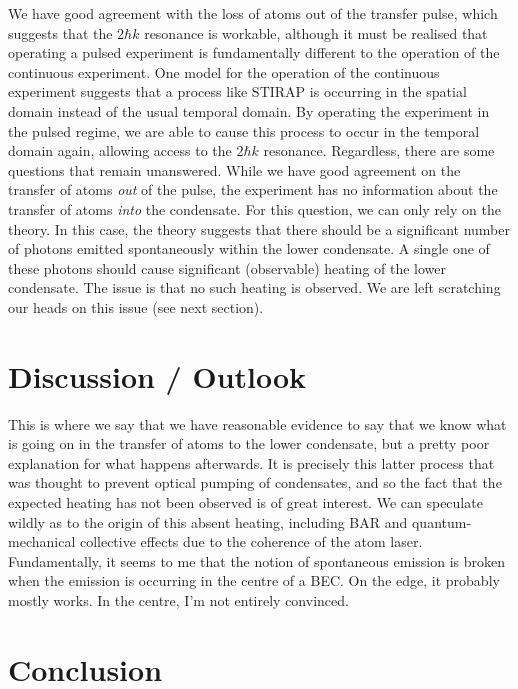 We have good agreement with the loss of atoms out of the transfer pulse, which suggests that the $2 \hbar k$ resonance is workable, although it must be realised that operating a pulsed experiment is fundamentally different to the operation of the continuous experiment.  One model for the operation of the continuous experiment suggests that a process like STIRAP is occurring in the spatial domain instead of the usual temporal domain.  By operating the experiment in the pulsed regime, we are able to cause this process to occur in the temporal domain again, allowing access to the $2 \hbar k$ resonance.  Regardless, there are some questions that remain unanswered.  While we have good agreement on the transfer of atoms \emph{out} of the pulse, the experiment has no information about the transfer of atoms \emph{into} the condensate.  For this question, we can only rely on the theory.  In this case, the theory suggests that there should be a significant number of photons emitted spontaneously within the lower condensate.  A single one of these photons should cause significant (observable) heating of the lower condensate.  The issue is that no such heating is observed.  We are left scratching our heads on this issue (see next section).

\section{Discussion / Outlook}
\label{OpticalPumping:Discussion}

This is where we say that we have reasonable evidence to say that we know what is going on in the transfer of atoms to the lower condensate, but a pretty poor explanation for what happens afterwards.  It is precisely this latter process that was thought to prevent optical pumping of condensates, and so the fact that the expected heating has not been observed is of great interest.  We can speculate wildly as to the origin of this absent heating, including BAR and quantum-mechanical collective effects due to the coherence of the atom laser.  Fundamentally, it seems to me that the notion of spontaneous emission is broken when the emission is occurring in the centre of a BEC.  On the edge, it probably mostly works.  In the centre, I'm not entirely convinced.

\section{Conclusion}

